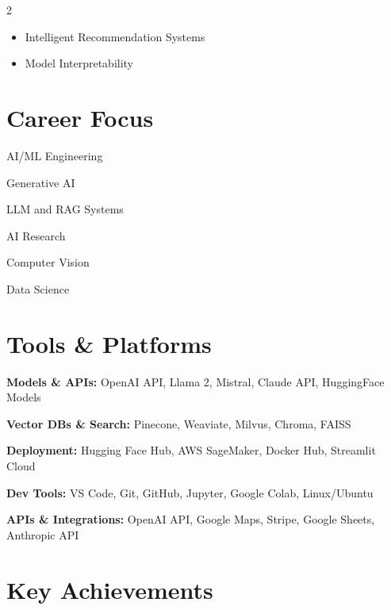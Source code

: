 \documentclass[10pt,a4paper]{article}
\newcommand{\skill}[2]{
    \textbf{#1:} #2
    \par\vspace{1.2mm}
}
\begin{document}
\begin{multicols}{2}
\begin{itemize}
\item Intelligent Recommendation Systems

\item Model Interpretability

\end{itemize}


\section{Career Focus}

AI/ML Engineering

\vspace{1mm}

Generative AI

\vspace{1mm}

LLM and RAG Systems

\vspace{1mm}

AI Research

\vspace{1mm}

Computer Vision

\vspace{1mm}

Data Science

\section{Tools \& Platforms}
\skill{Models \& APIs}{
OpenAI API, Llama 2, Mistral, Claude API, HuggingFace Models
}

\skill{Vector DBs \& Search}{
Pinecone, Weaviate, Milvus, Chroma, FAISS
}

\skill{Deployment}{
Hugging Face Hub, AWS SageMaker, Docker Hub, Streamlit Cloud
}

\skill{Dev Tools}{
VS Code, Git, GitHub, Jupyter, Google Colab, Linux/Ubuntu
}

\skill{APIs \& Integrations}{
OpenAI API, Google Maps, Stripe, Google Sheets, Anthropic API
}

\section{Key Achievements}


\end{multicols}
\end{document}

